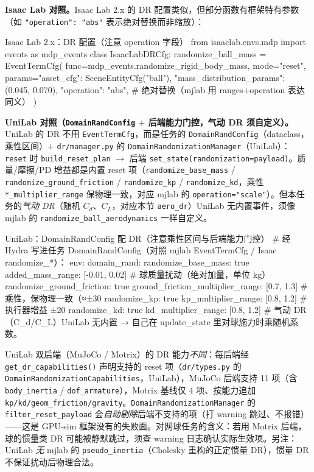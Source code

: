 \textbf{Isaac Lab 对照。}Isaac Lab 2.x 的 DR 配置类似，但部分函数有框架特有参数（如 \verb|"operation": "abs"| 表示绝对替换而非缩放）：

\begin{codebox}[Python]{Isaac Lab 2.x：DR 配置（注意 operation 字段）}
from isaaclab.envs.mdp import events as mdp_events
class IsaacLabDRCfg:
    randomize_ball_mass = EventTermCfg(
        func=mdp_events.randomize_rigid_body_mass,
        mode="reset",
        params={"asset_cfg": SceneEntityCfg("ball"),
                "mass_distribution_params": (0.045, 0.070),
                "operation": "abs"},          # 绝对替换（mjlab 用 ranges+operation 表达同义）
    )
\end{codebox}

\textbf{UniLab 对照（\texttt{DomainRandConfig} $+$ 后端能力门控，气动 DR 须自定义）。}UniLab 的 DR 不用 \verb|EventTermCfg|，而是任务的 \verb|DomainRandConfig|（dataclass，乘性区间）$+$ \verb|dr/manager.py| 的 \verb|DomainRandomizationManager|（UniLab）：\verb|reset| 时 \verb|build_reset_plan| $\to$ 后端 \verb|set_state(randomization=payload)|。质量/摩擦/PD 增益都是内置 reset 项（\verb|randomize_base_mass| / \verb|randomize_ground_friction| / \verb|randomize_kp| / \verb|randomize_kd|，乘性 \verb|*_multiplier_range| 保物理一致，对应 mjlab 的 \verb|operation="scale"|）。但本任务的\emph{气动 DR}（随机 $C_d$、$C_L$，对应本节 \verb|aero_dr|）UniLab 无内置事件，须像 mjlab 的 \verb|randomize_ball_aerodynamics| 一样自定义。

\begin{codebox}[Python]{UniLab：DomainRandConfig 配 DR（注意乘性区间与后端能力门控）}
# 经 Hydra 写进任务 DomainRandConfig（对照 mjlab EventTermCfg / Isaac randomize_*）：
env:
  domain_rand:
    randomize_base_mass: true
    added_mass_range: [-0.01, 0.02]        # 球质量扰动（绝对加量，单位 kg）
    randomize_ground_friction: true
    ground_friction_multiplier_range: [0.7, 1.3]   # 乘性，保物理一致（≈±30%
    randomize_kp: true
    kp_multiplier_range: [0.8, 1.2]        # 执行器增益 ±20%
    randomize_kd: true
    kd_multiplier_range: [0.8, 1.2]
# 气动 DR（C_d/C_L）UniLab 无内置 → 自己在 update_state 里对球施力时乘随机系数。
\end{codebox}

\begin{insight}\label{ins:rlmc-strike-unilab-dr-gating}
UniLab 双后端（MuJoCo / Motrix）的 DR 能力\emph{不同}：每后端经 \verb|get_dr_capabilities()| 声明支持的 reset 项（\verb|dr/types.py| 的 \verb|DomainRandomizationCapabilities|，UniLab），MuJoCo 后端支持 11 项（含 \verb|body_inertia| / \verb|dof_armature|），Motrix 基线仅 4 项、按能力追加 \verb|kp/kd/geom_friction/gravity|。\verb|DomainRandomizationManager| 的 \verb|filter_reset_payload| 会\emph{自动剔除}后端不支持的项（打 warning 跳过、不报错）——这是 GPU-sim 框架没有的失败面。对网球任务的含义：若用 Motrix 后端，球的惯量类 DR 可能被静默跳过，须查 warning 日志确认实际生效项。另注：UniLab \emph{无} mjlab 的 \verb|pseudo_inertia|（Cholesky 重构的正定惯量 DR），惯量 DR 不保证扰动后物理合法。
\end{insight}

